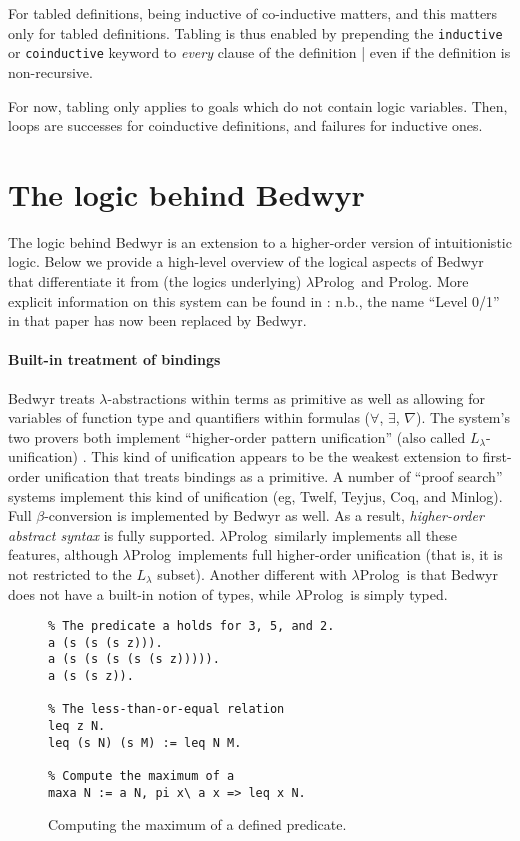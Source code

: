 \documentclass{article}
\newcommand{\lp}{$\lambda$Prolog}
\begin{document}
For tabled definitions, being inductive of co-inductive matters, and this 
matters only for tabled definitions.
Tabling is thus enabled by prepending the \texttt{inductive} or
\texttt{coinductive} keyword to \emph{every} clause of the definition |
even if the definition is non-recursive.

For now, tabling only applies to goals which do not contain logic variables.
Then, loops are successes for coinductive definitions,
and failures for inductive ones.


\section{The logic behind Bedwyr}
\label{logic}

The logic behind Bedwyr is an extension to a higher-order version of
intuitionistic logic.  Below we provide a high-level overview of the
logical aspects of Bedwyr that differentiate it from (the logics
underlying) \lp\ and Prolog.  More explicit information on this system
can be found in \cite{tiu05eshol}: n.b., the name ``Level 0/1'' in
that paper has now been replaced by Bedwyr.


\paragraph{Built-in treatment of bindings}
Bedwyr treats $\lambda$-abstractions within terms as primitive as well
as allowing for variables of function type and quantifiers within
formulas ($\forall$, $\exists$, $\nabla$).  The system's two provers
both implement ``higher-order pattern unification'' (also called
$L_\lambda$-unification) \cite{miller91jlc}.   This kind of unification
appears to be the weakest extension to first-order unification that
treats bindings as a primitive.  A number of ``proof search'' systems
implement this kind of unification (eg, Twelf, Teyjus, Coq, and
Minlog).  Full $\beta$-conversion is implemented by Bedwyr as well.
As a result, {\em higher-order abstract syntax} is fully supported.
\lp\ similarly implements all these features, although \lp\ implements
full higher-order unification (that is, it is not restricted to the
$L_\lambda$ subset).  Another different with \lp\ is that Bedwyr does
not have a built-in notion of types, while \lp\ is simply typed.

\begin{figure}
\begin{verbatim}
% The predicate a holds for 3, 5, and 2.
a (s (s (s z))).
a (s (s (s (s (s z))))).
a (s (s z)).

% The less-than-or-equal relation
leq z N.
leq (s N) (s M) := leq N M.

% Compute the maximum of a
maxa N := a N, pi x\ a x => leq x N.
\end{verbatim}
\caption{Computing the maximum of a defined predicate.}
\label{maxa}
\end{figure}
\end{document}
